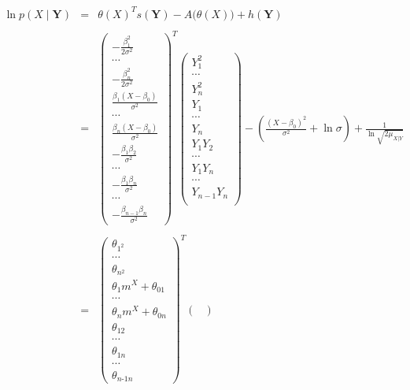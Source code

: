 \documentclass[11pt, oneside]{article}   	%
\numberwithin{figure}{section}
\numberwithin{equation}{section}
\numberwithin{table}{section}
\begin{document}
\begin{itemize}
\begin{eqnarray*}
\ln p(X\mid \mathbf{Y}) &=& \theta(X)^T s(\mathbf{Y}) - A \big(\theta(X) \big) + h(\mathbf{Y})\\\\
&=&
\begin{pmatrix}
-\frac{\beta_1^2}{2\sigma^2}\\
\cdots\\
-\frac{\beta_n^2}{2\sigma^2}\\
\frac{\beta_1(X-\beta_0)}{\sigma^2}\\
\cdots\\
\frac{\beta_n(X-\beta_0)}{\sigma^2}\\
-\frac{\beta_1\beta_2}{\sigma^2}\\
\cdots\\
-\frac{\beta_1\beta_n}{\sigma^2}\\
\cdots\\
-\frac{\beta_{n-1}\beta_n}{\sigma^2}
\end{pmatrix}^T
\begin{pmatrix}
Y_1^2\\
\cdots\\
Y_n^2\\
Y_1\\
\cdots\\
Y_n\\
Y_1 Y_2\\
\cdots\\
Y_1 Y_n\\
\cdots\\
Y_{n-1}Y_{n}\\
\end{pmatrix}
- \left( \frac{(X-\beta_0)^2}{\sigma^2} + \ln{\sigma} \right) + \frac{1}{\ln{\sqrt{2\mu_{X|Y}}}}\\\\
&=&
\begin{pmatrix}
\theta_{1^2}\\
\cdots\\
\theta_{n^2}\\
\theta_1 m^X+\theta_{01}\\
\cdots\\
\theta_n m^X+\theta_{0n}\\
\theta_{12}\\
\cdots\\
\theta_{1n}\\
\cdots\\
\theta_{n\mbox{-}1n}
\end{pmatrix}^T
\begin{pmatrix}

\end{pmatrix}
\end{eqnarray*}
\end{itemize}
\end{document}
